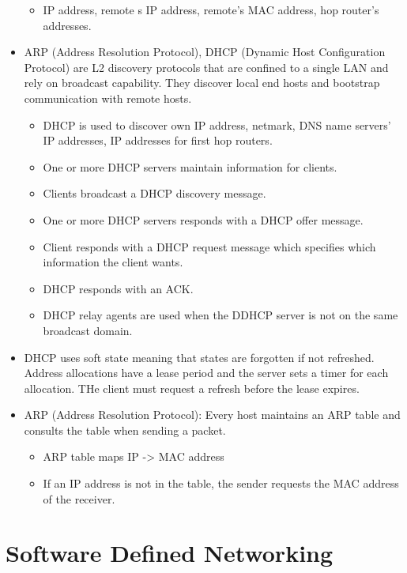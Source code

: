 \documentclass[]{article}
\providecommand{\tightlist}{%
  \setlength{\itemsep}{0pt}\setlength{\parskip}{0pt}}
\begin{document}
\begin{itemize}
  \begin{itemize}
  \tightlist
  \item
    IP address, remote s IP address, remote's MAC address, hop router's
    addresses.
  \end{itemize}
\item
  ARP (Address Resolution Protocol), DHCP (Dynamic Host Configuration
  Protocol) are L2 discovery protocols that are confined to a single LAN
  and rely on broadcast capability. They discover local end hosts and
  bootstrap communication with remote hosts.

  \begin{itemize}
  \tightlist
  \item
    DHCP is used to discover own IP address, netmark, DNS name servers'
    IP addresses, IP addresses for first hop routers.
  \item
    One or more DHCP servers maintain information for clients.
  \item
    Clients broadcast a DHCP discovery message.
  \item
    One or more DHCP servers responds with a DHCP offer message.
  \item
    Client responds with a DHCP request message which specifies which
    information the client wants.
  \item
    DHCP responds with an ACK.
  \item
    DHCP relay agents are used when the DDHCP server is not on the same
    broadcast domain.
  \end{itemize}
\item
  DHCP uses soft state meaning that states are forgotten if not
  refreshed. Address allocations have a lease period and the server sets
  a timer for each allocation. THe client must request a refresh before
  the lease expires.
\item
  ARP (Address Resolution Protocol): Every host maintains an ARP table
  and consults the table when sending a packet.

  \begin{itemize}
  \tightlist
  \item
    ARP table maps IP -\textgreater{} MAC address
  \item
    If an IP address is not in the table, the sender requests the MAC
    address of the receiver.
  \end{itemize}
\end{itemize}

\hypertarget{software-defined-networking}{%
\section{Software Defined
Networking}\label{software-defined-networking}}
\end{document}
